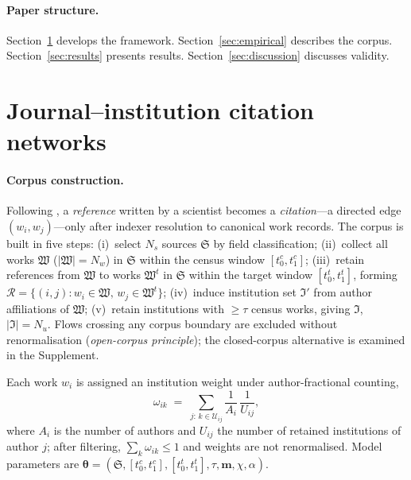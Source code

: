 \documentclass[10pt]{article}
\begin{document}
\paragraph{Paper structure.}
Section~\ref{sec:networks} develops the framework.
Section~\ref{sec:empirical} describes the corpus.
Section~\ref{sec:results} presents results.
Section~\ref{sec:discussion} discusses validity.

\section{Journal--institution citation networks}
\label{sec:networks}

\paragraph{Corpus construction.}

Following \citet{woutersThesisCitationCulture1999}, a \emph{reference}
written by a scientist becomes a \emph{citation}---a directed edge
$(w_i,w_j)$---only after indexer resolution to canonical work records.
The corpus is built in five steps:
(i)~select $N_s$ sources $\mathfrak{S}$ by field classification;
(ii)~collect all works $\mathfrak{W}$ ($|\mathfrak{W}|=N_w$) in
$\mathfrak{S}$ within the census window $[t^c_0,t^c_1]$;
(iii)~retain references from $\mathfrak{W}$ to works $\mathfrak{W}^t$
in $\mathfrak{S}$ within the target window $[t^t_0,t^t_1]$, forming
$\mathcal{R}=\{(i,j):w_i\in\mathfrak{W},\,w_j\in\mathfrak{W}^t\}$;
(iv)~induce institution set $\mathfrak{I}'$ from author affiliations
of $\mathfrak{W}$;
(v)~retain institutions with $\geq\tau$ census works, giving
$\mathfrak{I}$, $|\mathfrak{I}|=N_u$.
Flows crossing any corpus boundary are excluded without renormalisation
(\emph{open-corpus principle}); the closed-corpus alternative is
examined in the Supplement.

Each work $w_i$ is assigned an institution weight under
author-fractional counting,
\begin{equation}
  \omega_{ik} \;=\;
  \sum_{j:\,k\in\mathcal{U}_{ij}}
  \frac{1}{A_i}\,\frac{1}{U_{ij}},
  \label{eq:omega}
\end{equation}
where $A_i$ is the number of authors and $U_{ij}$ the number of
retained institutions of author $j$; after filtering,
$\sum_k\omega_{ik}\leq 1$ and weights are not renormalised.
Model parameters are
$\boldsymbol{\theta}=(\mathfrak{S},[t^c_0,t^c_1],[t^t_0,t^t_1],
\tau,\mathbf{m},\chi,\alpha)$.
\end{document}

